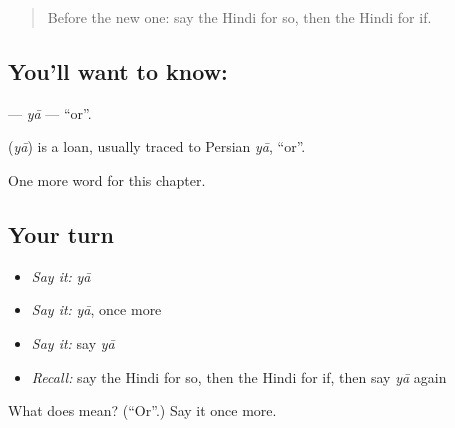 \label{lesson:HI-C247-ya}



\begin{quote}
Before the new one: say the Hindi for so, then the Hindi for if.
\end{quote}

\subsection*{You'll want to know: }
\textbf{} — \emph{yā} — \textquotedblleft{}or\textquotedblright{}.

\begin{cousinweb}
\textbf{} (\emph{yā}) is a loan, usually traced to Persian \emph{yā}, \textquotedblleft{}or\textquotedblright{}.
\end{cousinweb}

\begin{grammarlens}[title={What you've built}]
One more word for this chapter.
\end{grammarlens}

\subsection*{Your turn}
\begin{itemize}
\raggedright
  \item \emph{Say it:} \emph{yā}
  \item \emph{Say it:} \emph{yā}, once more
  \item \emph{Say it:} say \emph{yā}
  \item \emph{Recall:} say the Hindi for so, then the Hindi for if, then say \emph{yā} again
\end{itemize}

\begin{tcolorbox}[breakable,colback=teal!4,colframe=teal!35!black,title={Before you move on}]
What does  mean? (\textquotedblleft{}Or\textquotedblright{}.) Say it once more.
\end{tcolorbox}
